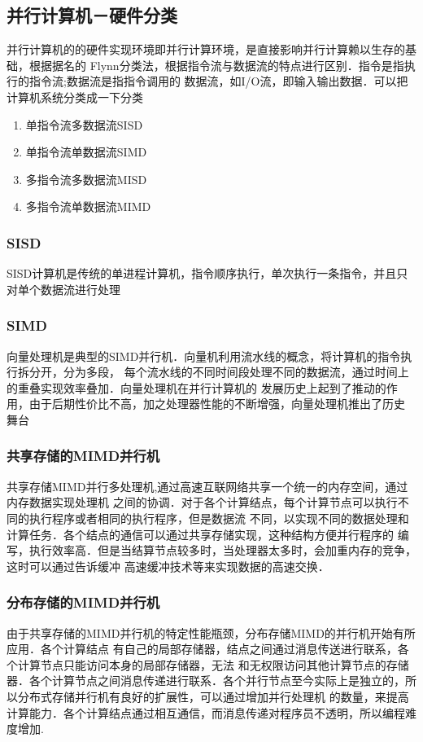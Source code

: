 \subsection{并行计算机－硬件分类}
    并行计算机的的硬件实现环境即并行计算环境，是直接影响并行计算赖以生存的基础，根据据名的
Flynn分类法，根据指令流与数据流的特点进行区别．指令是指执行的指令流;数据流是指指令调用的
数据流，如I/O流，即输入输出数据．可以把计算机系统分类成一下分类
    \begin{enumerate}
    \item 单指令流多数据流SISD
    \item 单指令流单数据流SIMD
    \item 多指令流多数据流MISD
    \item 多指令流单数据流MIMD
    \end{enumerate}
\subsubsection{SISD}
    SISD计算机是传统的单进程计算机，指令顺序执行，单次执行一条指令，并且只对单个数据流进行处理
\subsubsection{SIMD}
    向量处理机是典型的SIMD并行机．向量机利用流水线的概念，将计算机的指令执行拆分开，分为多段，
每个流水线的不同时间段处理不同的数据流，通过时间上的重叠实现效率叠加．向量处理机在并行计算机的
发展历史上起到了推动的作用，由于后期性价比不高，加之处理器性能的不断增强，向量处理机推出了历史
舞台
\subsubsection{共享存储的MIMD并行机}
    共享存储MIMD并行多处理机,通过高速互联网络共享一个统一的内存空间，通过内存数据实现处理机
之间的协调．对于各个计算结点，每个计算节点可以执行不同的执行程序或者相同的执行程序，但是数据流
不同，以实现不同的数据处理和计算任务．各个结点的通信可以通过共享存储实现，这种结构方便并行程序的
编写，执行效率高．但是当结算节点较多时，当处理器太多时，会加重内存的竞争，这时可以通过告诉缓冲
高速缓冲技术等来实现数据的高速交换．
\subsubsection{分布存储的MIMD并行机}
    由于共享存储的MIMD并行机的特定性能瓶颈，分布存储MIMD的并行机开始有所应用．各个计算结点
有自己的局部存储器，结点之间通过消息传送进行联系，各个计算节点只能访问本身的局部存储器，无法
和无权限访问其他计算节点的存储器．各个计算节点之间消息传递进行联系．各个并行节点至今实际上是独立的，所以分布式存储并行机有良好的扩展性，可以通过增加并行处理机
的数量，来提高计算能力．各个计算结点通过相互通信，而消息传递对程序员不透明，所以编程难度增加.

